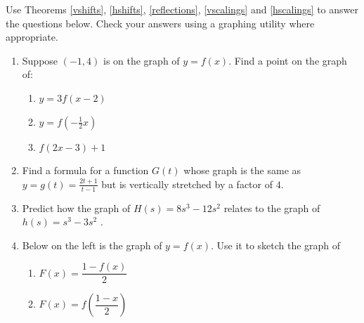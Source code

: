 \documentclass{ximera}
\begin{document}
\begin{example}  \label{scalingsex} 


Use Theorems  \ref{vshifts},  \ref{hshifts}, \ref{reflections}, \ref{vscalings} and \ref{hscalings}  to answer the questions below.  Check your answers using a graphing utility where appropriate.
 
 \begin{enumerate}
 
 \item   Suppose $(-1,4)$ is on the graph of $y = f(x)$.  Find a point on the graph of:
 
 \begin{multicols}{3}
 
 \begin{enumerate}
 
 \item $y = 3f(x-2)$
 
 \item $y = f\left(-\frac{1}{2} x \right)$
 
 \item  $f(2x-3)+1$
 
 \end{enumerate}
 
 \end{multicols}
 
 \item  Find a formula for a function $G(t)$ whose graph is the same as $y=g(t) = \frac{2t+1}{t-1}$ but is vertically stretched by a factor of $4$.
  
 \item Predict how the graph of $H(s) = 8s^3 - 12s^2$ relates to the graph of $h(s) = s^3-3s^2$ . 
 
\item  Below on the left is the graph of $y = f(x)$.  Use it to sketch the graph of

  \begin{multicols}{2}
 
 \begin{enumerate}
 
 \item $F(x) = \dfrac{1-f(x)}{2}$
 
  \item  $F(x)= f\left( \dfrac{1-x}{2} \right)$
 
 \end{enumerate}
 
 \end{multicols}
 
 \enlargethispage{0.25in}
 

\end{enumerate}
\end{example}
\end{document}
